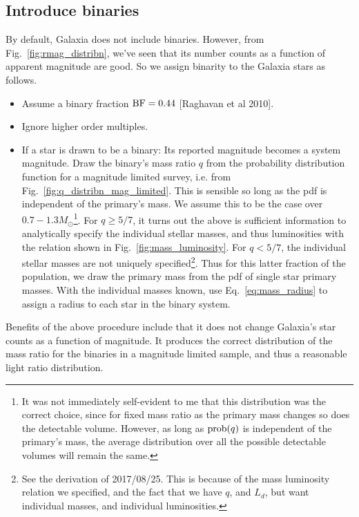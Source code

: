 \documentclass{emulateapj}
\begin{document}
\subsection{Introduce binaries}
\label{subsec:introduce_binaries}

By default, Galaxia does not include binaries.
However, from Fig.~\ref{fig:rmag_distribn}, we've seen that its number counts 
as a function of apparent magnitude are good.
So we assign binarity to the Galaxia stars as follows.
\begin{itemize}
	\item Assume a binary fraction ${\rm BF} = 0.44$ [Raghavan et al 2010].
	\item Ignore higher order multiples.
	\item If a star is drawn to be a binary:
	\subitem Its reported magnitude becomes a system magnitude.
	\subitem Draw the binary's mass ratio $q$ from the probability distribution 
	function for a magnitude limited survey, i.e. from 
	Fig.~\ref{fig:q_distribn_mag_limited}. This is sensible so long as the pdf 
	is independent of the primary's mass. We assume this to be the case over 
	$0.7-1.3M_\odot$\footnote{It was not immediately self-evident to me that 
	this distribution was the correct choice, since for fixed mass ratio as the 
	primary mass changes so does the detectable volume. However, as long as 
	${\rm prob}(q)$ is independent of the primary's mass, the average 
	distribution over all the possible detectable volumes will remain the 
	same.}.
	\subitem For $q \geq 5/7$, it turns out the above is sufficient information 
	to analytically specify the individual stellar masses, and thus 
	luminosities with the relation shown in Fig.~\ref{fig:mass_luminosity}.
	\subitem For $q < 5/7$, the individual stellar masses are not uniquely 
	specified\footnote{See the derivation of 2017/08/25. This is because of the 
	mass luminosity relation we specified, and the fact that we have $q$, and 
	$L_d$, but want individual masses, and individual luminosities.}. Thus for 
	this latter fraction of the population, we draw the 
	primary mass from the pdf of single star primary masses.
	\subitem With the individual masses known, use Eq.~\ref{eq:mass_radius} to 
	assign a radius to each star in the binary system.
\end{itemize}

Benefits of the above procedure include that it does not change Galaxia's 
star counts as a function of magnitude.
It produces the correct distribution of the mass ratio for the binaries in a 
magnitude limited sample, and thus a reasonable light ratio distribution. 
\end{document}

